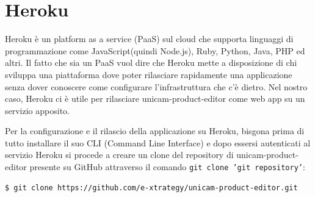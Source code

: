 \section{Heroku}
Heroku è un platform as a service (PaaS) sul cloud che supporta linguaggi di programmazione come JavaScript(quindi Node.js), Ruby, Python, Java, PHP ed altri.
Il fatto che sia un PaaS vuol dire che Heroku mette a disposizione di chi sviluppa una piattaforma dove poter rilasciare rapidamente una applicazione senza dover conoscere come configurare l’infrastruttura che c’è dietro.
Nel nostro caso, Heroku ci è utile per rilasciare unicam-product-editor come web app su un servizio apposito.

Per la configurazione e il rilascio della applicazione su Heroku, bisgona prima di tutto installare il suo CLI (Command Line Interface) e dopo essersi autenticati al servizio Heroku si procede a creare un clone del repository di unicam-product-editor presente su GitHub attraverso il comando \texttt{git clone 'git repository'}:

\begin{lstlisting}[style=javaScriptCode]
$ git clone https://github.com/e-xtrategy/unicam-product-editor.git
\end{lstlisting}

